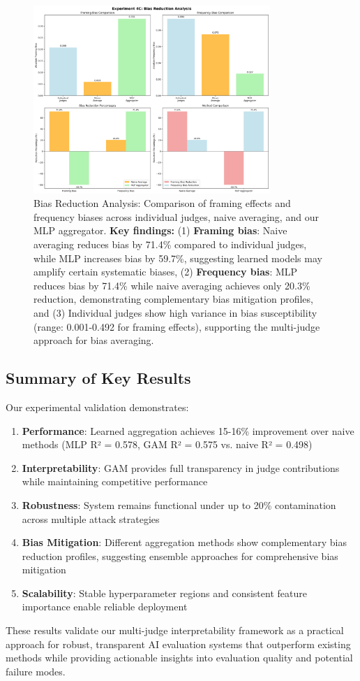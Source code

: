 \begin{figure}[htbp]
    \centering
    \includegraphics[width=0.8\textwidth]{experiments/4c_bias_transfer/results/20250814_144816_bias_reduction_plots.png}
    \caption{Bias Reduction Analysis: Comparison of framing effects and frequency biases across individual judges, naive averaging, and our MLP aggregator. \textbf{Key findings:} (1) \textbf{Framing bias}: Naive averaging reduces bias by 71.4\% compared to individual judges, while MLP increases bias by 59.7\%, suggesting learned models may amplify certain systematic biases, (2) \textbf{Frequency bias}: MLP reduces bias by 71.4\% while naive averaging achieves only 20.3\% reduction, demonstrating complementary bias mitigation profiles, and (3) Individual judges show high variance in bias susceptibility (range: 0.001-0.492 for framing effects), supporting the multi-judge approach for bias averaging.}
    \label{fig:bias_reduction}
\end{figure}

\subsection{Summary of Key Results}

Our experimental validation demonstrates:

\begin{enumerate}
    \item \textbf{Performance}: Learned aggregation achieves 15-16\% improvement over naive methods (MLP R² = 0.578, GAM R² = 0.575 vs. naive R² = 0.498)
    \item \textbf{Interpretability}: GAM provides full transparency in judge contributions while maintaining competitive performance
    \item \textbf{Robustness}: System remains functional under up to 20\% contamination across multiple attack strategies
    \item \textbf{Bias Mitigation}: Different aggregation methods show complementary bias reduction profiles, suggesting ensemble approaches for comprehensive bias mitigation
    \item \textbf{Scalability}: Stable hyperparameter regions and consistent feature importance enable reliable deployment
\end{enumerate}

These results validate our multi-judge interpretability framework as a practical approach for robust, transparent AI evaluation systems that outperform existing methods while providing actionable insights into evaluation quality and potential failure modes.